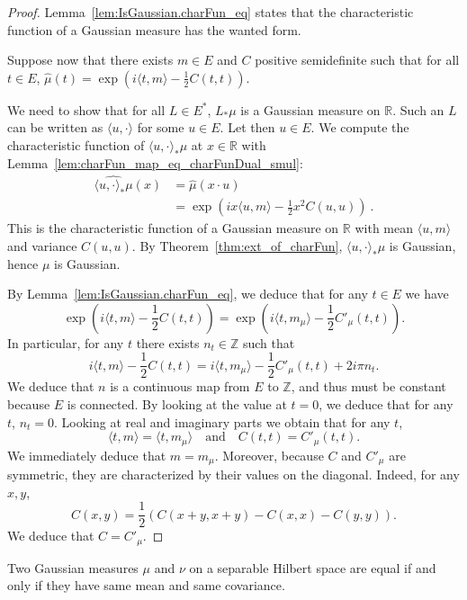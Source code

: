 \begin{proof}\leanok
Lemma~\ref{lem:IsGaussian.charFun_eq} states that the characteristic function of a Gaussian measure has the wanted form.

Suppose now that there exists $m \in E$ and $C$ positive semidefinite such that for all $t \in E$, $\hat{\mu}(t) = \exp\left(i \langle t, m \rangle - \frac{1}{2} C(t, t)\right)$.

We need to show that for all $L \in E^*$, $L_*\mu$ is a Gaussian measure on $\mathbb{R}$.
Such an $L$ can be written as $\langle u, \cdot \rangle$ for some $u \in E$.
Let then $u \in E$. We compute the characteristic function of $\langle u, \cdot\rangle_*\mu$ at $x \in \mathbb{R}$ with Lemma~\ref{lem:charFun_map_eq_charFunDual_smul}:
\begin{align*}
  \widehat{\langle u, \cdot\rangle_*\mu}(x)
  &= \hat{\mu}(x \cdot u)
  \\
  &= \exp\left(i x \langle u, m \rangle - \frac{1}{2} x^2 C(u, u)\right)
  \: .
\end{align*}
This is the characteristic function of a Gaussian measure on $\mathbb{R}$ with mean $\langle u, m \rangle$ and variance $C(u, u)$.
By Theorem~\ref{thm:ext_of_charFun}, $\langle u, \cdot\rangle_*\mu$ is Gaussian, hence $\mu$ is Gaussian.

By Lemma~\ref{lem:IsGaussian.charFun_eq}, we deduce that for any $t \in E$ we have
$$\exp\left(i\langle t, m \rangle - \frac{1}{2} C(t, t)\right) = \exp\left(i\langle t, m_\mu \rangle - \frac{1}{2} C'_\mu(t, t)\right).$$
In particular, for any $t$ there exists $n_t \in \mathbb{Z}$ such that
$$i\langle t, m \rangle - \frac{1}{2} C(t, t) = i\langle t, m_\mu \rangle - \frac{1}{2} C'_\mu(t, t) + 2i\pi n_t.$$
We deduce that $n$ is a continuous map from $E$ to $\mathbb{Z}$, and thus must be constant because $E$ is connected. By looking at the value at $t = 0$, we deduce that for any $t$, $n_t = 0$. Looking at real and imaginary parts we obtain that for any $t$,
$$\langle t, m \rangle = \langle t, m_\mu \rangle \quad \text{and} \quad C(t, t) = C'_\mu(t, t).$$
We immediately deduce that $m = m_\mu$. Moreover, because $C$ and $C'_\mu$ are symmetric, they are characterized by their values on the diagonal. Indeed, for any $x, y$,
$$C(x, y) = \frac{1}{2} (C(x + y, x + y) - C(x, x) - C(y, y)).$$
We deduce that $C = C'_\mu$.
\end{proof}

\begin{lemma}\label{lem:IsGaussian.ext_iff}
  \leanok
Two Gaussian measures $\mu$ and $\nu$ on a separable Hilbert space are equal if and only if they have same mean and same covariance.
\end{lemma}

